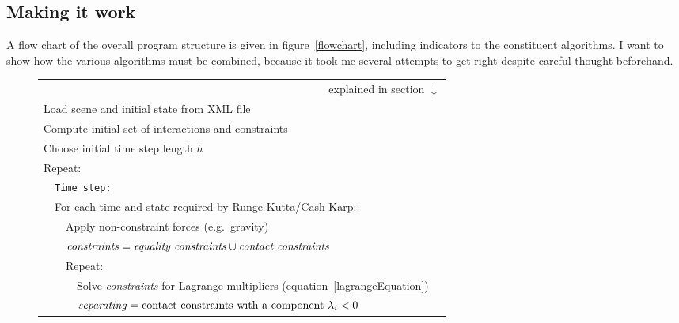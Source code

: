 \subsection{Making it work}

A flow chart of the overall program structure is given in figure~\ref{flowchart}, including
indicators to the constituent algorithms. I want to show how the various algorithms must be
combined, because it took me several attempts to get right despite careful thought beforehand.

\begin{figure}
\renewcommand{\baselinestretch}{1.3}\small\normalsize
\newcommand{\spx}{\vspace*{\baselineskip}\\}
\newcommand{\curly}[2]{\zerobox{b}{\mbox{$\left\}\:#1\begin{array}{l}#2\end{array}\right.$}}}
\begin{tabular}{|l|l|l|l|@{}l}
\multicolumn{5}{r}{explained in section $\downarrow$}\\\cline{1-4}
\multicolumn{4}{|l|}{Load scene and initial state from XML file}
&\curly{\ref{softwareTools}}{\spx}\hspace*{7mm}\\\cline{1-4}
\multicolumn{4}{|l|}{Compute initial set of interactions and constraints}&
\curly{\ref{meshIntersection}}{\spx}\\\cline{1-4}
\multicolumn{4}{|l|}{Choose initial time step length $h$}\\\cline{1-4}
\multicolumn{4}{|l|}{Repeat:}\\\cline{2-4}
    &\multicolumn{3}{|l|}{\texttt{Time step:}}\\\cline{2-4}
    &\multicolumn{3}{|l|}{For each time and state required by Runge-Kutta/Cash-Karp:}&
    \curly{\ref{solvingODEs}}{\spx}\\\cline{3-4}
        &&\multicolumn{2}{|l|}{Apply non-constraint forces (e.g.\ gravity)}\\\cline{3-4}
        &&\multicolumn{2}{|l|}{$\mbox{\textit{constraints}} = \mbox{\textit{equality constraints}}
        \cup \mbox{\textit{contact constraints}}$}\\\cline{3-4}
        &&\multicolumn{2}{|l|}{Repeat:}\\\cline{4-4}
            &&&Solve \textit{constraints} for Lagrange multipliers (equation~\ref{lagrangeEquation})\\\cline{4-4}
            &&&$\mbox{\textit{separating}} = \mbox{contact constraints with a component } \lambda_i < 0$&

\end{tabular}
\end{figure}
